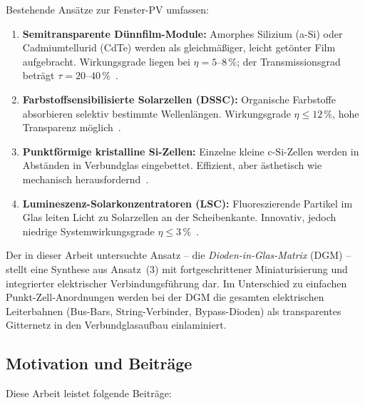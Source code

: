 ﻿\documentclass[a4paper,12pt]{article}
\theoremstyle{definition}
\theoremstyle{remark}
\begin{document}
Bestehende Ansätze zur Fenster-PV umfassen:
\begin{enumerate}
  \item \textbf{Semitransparente Dünnfilm-Module:} Amorphes Silizium (a-Si)
    oder Cadmiumtellurid (CdTe) werden als gleichmäßiger, leicht getönter Film
    aufgebracht. Wirkungsgrade liegen bei $\eta = 5$--$8\,\%$; der
    Transmissionsgrad beträgt $\tau = 20$--$40\,\%$~\cite{Cannavale2020}.

  \item \textbf{Farbstoffsensibilisierte Solarzellen (DSSC):} Organische
    Farbstoffe absorbieren selektiv bestimmte Wellenlängen.
    Wirkungsgrade $\eta \le 12\,\%$, hohe Transparenz möglich~\cite{Koerner2015}.

  \item \textbf{Punktförmige kristalline Si-Zellen:} Einzelne kleine
    c-Si-Zellen werden in Abständen in Verbundglas eingebettet. Effizient,
    aber ästhetisch wie mechanisch herausfordernd~\cite{Weller2014}.

  \item \textbf{Lumineszenz-Solarkonzentratoren (LSC):} Fluoreszierende
    Partikel im Glas leiten Licht zu Solarzellen an der Scheibenkante.
    Innovativ, jedoch niedrige Systemwirkungsgrade $\eta \le 3\,\%$~\cite{Brovelli2022}.
\end{enumerate}

Der in dieser Arbeit untersuchte Ansatz -- die \emph{Dioden-in-Glas-Matrix}
(DGM) -- stellt eine Synthese aus Ansatz~(3) mit fortgeschrittener
Miniaturisierung und integrierter elektrischer Verbindungsführung dar. Im
Unterschied zu einfachen Punkt-Zell-Anordnungen werden bei der DGM die
gesamten elektrischen Leiterbahnen (Bus-Bars, String-Verbinder, Bypass-Dioden)
als transparentes Gitternetz in den Verbundglasaufbau einlaminiert.

\subsection{Motivation und Beiträge}

Diese Arbeit leistet folgende Beiträge:
\end{document}
